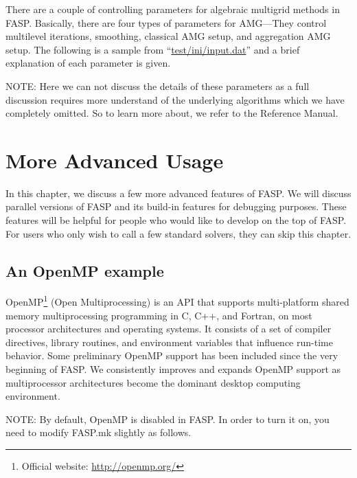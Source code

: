 \documentclass[11pt]{memoir}
\begin{document}
There are a couple of controlling parameters for algebraic multigrid methods in FASP. Basically, there are four types of parameters for AMG---They control multilevel iterations, smoothing, classical AMG setup, and aggregation AMG setup. The following is a sample from ``\url{test/ini/input.dat}'' and a brief explanation of each parameter is given.
%

%

\begin{snugshade}\noindent
NOTE: Here we can not discuss the details of these parameters as a full discussion requires more understand of the underlying algorithms which we have completely omitted. So to learn more about, we refer to the Reference Manual.
\end{snugshade}

\chapter{More Advanced Usage}\label{ch:advanced}

In this chapter, we discuss a few more advanced features of FASP. We will discuss parallel versions of FASP and its build-in features for debugging purposes. These features will be helpful for people who would like to develop on the top of FASP. For users who only wish to call a few standard solvers, they can skip this chapter.

\section{An OpenMP example}\label{sec:mop}

OpenMP\footnote{Official website: \url{http://openmp.org/}} (Open Multiprocessing) is an API that supports multi-platform shared memory multiprocessing programming in C, C++, and Fortran, on most processor architectures and operating systems. It consists of a set of compiler directives, library routines, and environment variables that influence run-time behavior. Some preliminary OpenMP support has been included since the very beginning of FASP. We consistently improves and expands OpenMP support as multiprocessor architectures become the dominant desktop computing environment.

\begin{snugshade}\noindent
NOTE: By default, OpenMP is disabled in FASP. In order to turn it on, you need to modify FASP.mk slightly as follows.
\end{snugshade}
\end{document}
